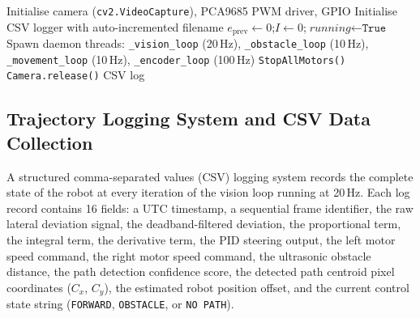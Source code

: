 \begin{algorithm}[H]
\DontPrintSemicolon
\caption{Autonomous Navigation Main Control Loop}
\label{alg:navloop}
\BlankLine
Initialise camera (\texttt{cv2.VideoCapture}), PCA9685 PWM driver, GPIO\;
Initialise CSV logger with auto-incremented filename\;
$e_{\text{prev}}\leftarrow 0$;\quad $I\leftarrow 0$;\quad $\textit{running}\leftarrow\texttt{True}$\;
Spawn daemon threads: \texttt{\_vision\_loop} (20\,Hz), \texttt{\_obstacle\_loop} (10\,Hz), \texttt{\_movement\_loop} (10\,Hz), \texttt{\_encoder\_loop} (100\,Hz)\;
\BlankLine
{}
\BlankLine
\texttt{StopAllMotors()}\; \texttt{Camera.release()}\; \Return CSV log\;
\end{algorithm}

\subsection{Trajectory Logging System and CSV Data Collection}

A structured comma-separated values (CSV) logging system records the complete
state of the robot at every iteration of the vision loop running at 20\,Hz.
Each log record contains 16 fields: a UTC timestamp, a sequential frame
identifier, the raw lateral deviation signal, the deadband-filtered deviation,
the proportional term, the integral term, the derivative term, the PID steering output, the left motor speed command, the right
motor speed command, the ultrasonic obstacle distance, the path detection
confidence score, the detected path centroid pixel coordinates ($C_x$, $C_y$),
the estimated robot position offset, and the current control state string
(\texttt{FORWARD}, \texttt{OBSTACLE}, or \texttt{NO PATH}).

